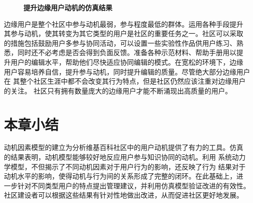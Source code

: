 \begin{figure}[!htb]
  \centering
  
 \caption{\small{\textbf{提升边缘用户动机的仿真结果}}}
  \label{fig:improve9}
\end{figure}

边缘用户是整个社区中参与动机最弱，参与程度最低的群体。运用各种手段提升
其参与动机，使其转变为其它类型的用户是社区的重要任务之一。社区可以采取
的措施包括鼓励用户多参与协同活动，可以设置一些实验性作品供用户练习、熟
悉，同时还不必考虑是否会得到负面反馈。准备各种示范材料、帮助手册用以提
升用户的编辑水平，帮助他们尽快适应协同编辑的模式。在宽松的环境下，边缘
用户容易培养自信，提升参与动机，同时提升编辑的质量。尽管绝大部分边缘用户在
其整个社区生涯中都不会改变其行为特点，但是社区仍然应该注重对边缘用户的关注。
社区只有拥有数量庞大的边缘用户才能不断涌现出高质量的用户。

\section{本章小结}

动机因素模型的建立为分析维基百科社区中的用户动机提供了有力的工具。仿真
的结果表明，动机模型能够较好地反应用户参与知识协同的动机。利用
系统动力学模型，不但揭示了不同动机因素对于用户行为的影响，还反映了行为
结果对于动机水平的影响，使得动机与行为间的关系形成了完整的闭环。在此基础上，进
一步针对不同类型用户的特点提出管理建议，并利用仿真模型验证改进的有效性。
社区建设者可以根据这些结果有针对性地做出改进，从而促进社区更好地发展。



